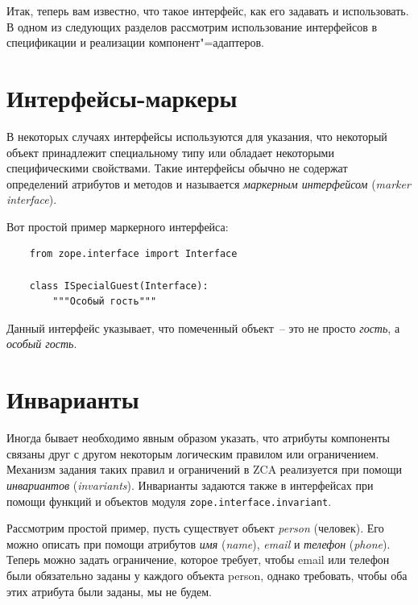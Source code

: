 \documentclass[a4paper,openany,twoside,final]{book}
\providecommand*{\DUroletitlereference}[1]{\textsl{#1}}
\begin{document}
Итак, теперь вам известно, что такое интерфейс, как его задавать и использовать.  В одном из следующих разделов рассмотрим использование интерфейсов в спецификации и реализации компонент"=адаптеров.


\section{Интерфейсы-маркеры%
  \label{id31}%
}

В некоторых случаях интерфейсы используются для указания, что некоторый объект принадлежит специальному типу или обладает некоторыми специфическими свойствами.  Такие интерфейсы обычно не содержат определений атрибутов и методов и называется \DUroletitlereference{маркерным интерфейсом} (\DUroletitlereference{marker interface}).

Вот простой пример маркерного интерфейса:

\begin{verbatim}
    from zope.interface import Interface

    class ISpecialGuest(Interface):
        """Особый гость"""
\end{verbatim}

Данный интерфейс указывает, что помеченный объект~-- это не просто \DUroletitlereference{гость}, а \DUroletitlereference{особый гость}.


\section{Инварианты%
  \label{id32}%
}

Иногда бывает необходимо явным образом указать, что атрибуты компоненты связаны друг с другом некоторым логическим правилом или ограничением.  Механизм задания таких правил и ограничений в ZCA реализуется при помощи \DUroletitlereference{инвариантов} (\DUroletitlereference{invariants}).  Инварианты задаются также в интерфейсах при помощи функций и объектов модуля \texttt{zope.interface.invariant}.

Рассмотрим простой пример, пусть существует объект \DUroletitlereference{person} (человек).  Его можно описать при помощи атрибутов \DUroletitlereference{имя} (\DUroletitlereference{name}), \DUroletitlereference{email} и \DUroletitlereference{телефон} (\DUroletitlereference{phone}).  Теперь можно задать ограничение, которое требует, чтобы email или телефон были обязательно заданы у каждого объекта person, однако требовать, чтобы оба этих атрибута были заданы, мы не будем.
\end{document}
